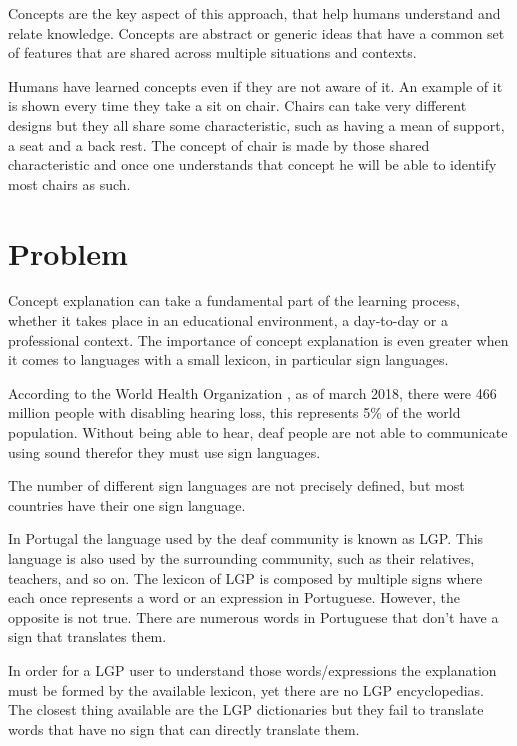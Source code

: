 Concepts are the key aspect of this approach, that help humans understand and relate knowledge.
Concepts are abstract or generic ideas that have a common set of features that are shared across multiple situations and contexts.

Humans have learned concepts even if they are not aware of it.
An example of it is shown every time they take a sit on chair.
Chairs can take very different designs but they all share some characteristic, such as having a mean of support, a seat and a back rest.
The concept of chair is made by those shared characteristic and once one understands that concept he will be able to identify most chairs as such.

\section{Problem}

Concept explanation can take a fundamental part of the learning process\cite{ghorbani2019towards}, whether it takes place in an educational environment, a day-to-day or a professional context.
The importance of concept explanation is even greater when it comes to languages with a small lexicon, in particular sign languages.

According to the World Health Organization \cite{who_2018}, as of march 2018, there were 466 million people with disabling hearing loss, this represents 5\% of the world population.
Without being able to hear, deaf people are not able to communicate using sound therefor they must use sign languages.

The number of different sign languages are not precisely defined, but most countries have their one sign language.

In Portugal the language used by the deaf community is known as \gls{LGP}.
This language is also used by the surrounding community, such as their relatives, teachers, and so on.
The lexicon of \gls{LGP} is composed by multiple signs where each once represents a word or an expression in Portuguese.
However, the opposite is not true.
There are numerous words in Portuguese that don't have a sign that translates them.

In order for a \gls{LGP} user to understand those words/expressions the explanation must be formed by the available lexicon\cite{musselman2000children}, yet there are no \gls{LGP} encyclopedias.
The closest thing available are the \gls{LGP} dictionaries but they fail to translate words that have no sign that can directly translate them.

